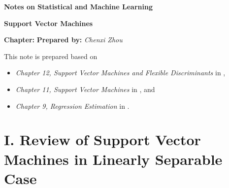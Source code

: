\documentclass[12pt]{article}
\newcommand{\titlebox}[4]{
\begin{tcolorbox}[colback = blue!5!white!95, colframe = blue!70!black
]
  \noindent \textbf{ #1 } \hfill \textit{#2} 
  \begin{center}
  	 \LARGE{\textbf{#3}}
  \end{center}
\textbf{Chapter:} \textit{\text{#4}} \hfill \textbf{Prepared by:} \textit{Chenxi Zhou}
\end{tcolorbox}
}
\begin{document}
\titlebox{Notes on Statistical and Machine Learning}{}{Support Vector Machines}{16}
\thispagestyle{plain}

\vspace{10pt}

This note is prepared based on 
\begin{itemize}
	\item \textit{Chapter 12, Support Vector Machines and Flexible Discriminants} in \textcites{Friedman2001-np}, 
	\item \textit{Chapter 11, Support Vector Machines} in \textcites{Izenman2009-jk}, and 
	\item \textit{Chapter 9, Regression Estimation} in \textcite{Scholkopf2002}. 
\end{itemize}


\section*{I. Review of Support Vector Machines in Linearly Separable Case} 
\end{document}
